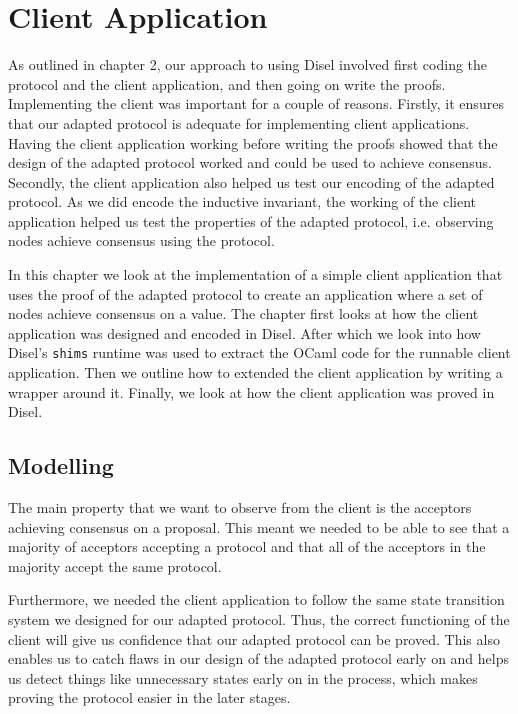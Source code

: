 \chapter{Client Application}
As outlined in chapter 2, our approach to using Disel involved first coding
the protocol and the client application, and then going on write the proofs.
Implementing the client was important for a couple of reasons.
Firstly, it ensures that our adapted protocol is adequate for
implementing client applications. Having the client application working before
writing the proofs showed
that the design of the adapted protocol worked and could be used
to achieve consensus. Secondly, the client application also helped us test
our encoding of the adapted protocol. As we did encode the inductive invariant,
the working of the client application helped us test the properties of the
adapted protocol, i.e. observing nodes achieve consensus using the protocol.

In this chapter we look at the implementation of a simple client application
that uses the proof of the adapted protocol to create an application where
a set of nodes achieve consensus on a value. The chapter first looks at how the client
application was designed and encoded in Disel. After which we look into how
Disel's \texttt{shims} runtime was used to extract the OCaml code for the
runnable client application. Then we outline how to extended the client
application by writing a wrapper around it. Finally, we look at how the client
application was proved in Disel.

\section{Modelling}

The main property that we want to observe from the client is the acceptors achieving
consensus on a proposal. This meant we needed to be able to see that a majority of
acceptors accepting a protocol and that all of the acceptors in the majority
accept the same protocol.

Furthermore, we needed the client application to follow the same state transition
system we designed for our adapted protocol. Thus, the correct functioning of the
client will give us confidence that our adapted protocol can be proved. This also
enables us to catch flaws in our design of the adapted protocol early on and helps
us detect things like unnecessary states early on in the process, which makes
proving the protocol easier in the later stages.


